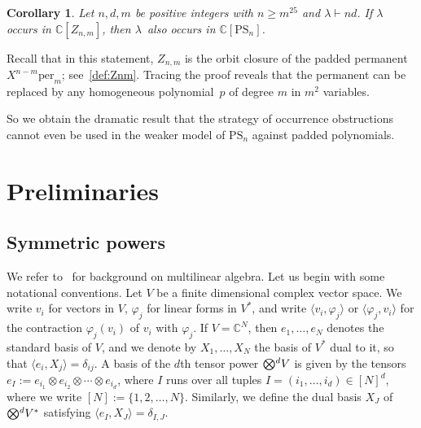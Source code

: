 \documentclass[11pt]{amsart}
\def\C{\mathbb{C}}
\def\per{\mathrm{per}}
\def\la{\lambda}
\newcommand{\tensor}{\smash{\textstyle\bigotimes}}
\newcommand{\PS}{\mathrm{PS}}
\numberwithin{equation}{section}
\newtheorem{corollary}[theorem]{Corollary}
\begin{document}
\begin{corollary}\label{cor:main-PS}
Let $n,d,m$ be positive integers with 
$n \ge m^{25}$ and $\la\vdash nd$. If $\la$ occurs in 
$\C[Z_{n,m}]$, then $\la$~also occurs in $\C[\PS_n]$. 
\end{corollary}

Recall that in this statement, $Z_{n,m}$ is the orbit closure of the padded permanent 
$X^{n-m} \per_m$; see~\eqref{def:Znm}. 
Tracing the proof reveals that the permanent can be replaced by 
any homogeneous polynomial~$p$ of degree $m$ in $m^2$ variables. 

So we obtain the dramatic result that the strategy of occurrence obstructions 
cannot even be used in the weaker model of $\PS_n$ against padded polynomials.


\section{Preliminaries} 
\label{sec:prelim}

\subsection{Symmetric powers}\label{sec:ML} %

We refer to~\cite{northcott:84} for background on multilinear algebra. 
Let us begin with some notational conventions. 
Let $V$ be a finite dimensional complex vector space. 
We write $v_i$ for vectors in $V$, $\varphi_j$ for linear 
forms in $V^*$, and write $\langle v_i, \varphi_j \rangle$ 
or $\langle \varphi_j ,v_i \rangle$ for the contraction $\varphi_j(v_i)$ 
of $v_i$ with $\varphi_j$. 
If $V=\C^N$, then $e_1,\ldots,e_N$ denotes the standard basis of $V$, 
and we denote by $X_1,\ldots,X_N$ the basis of $V^*$ dual to it, so that 
$\langle e_i, X_j\rangle =\delta_{ij}$. 
A basis of the $d$th tensor power $\tensor^d V$ is given by the tensors 
$e_I := e_{i_1} \otimes e_{i_2} \otimes \cdots \otimes e_{i_{d}}$, 
where $I$ runs over all tuples  
$I=(i_1,\ldots,i_d) \in [N]^d$, 
where we write $[N]:=\{1,2,\ldots,N\}$. 
Similarly, we define the dual basis $X_J$ of $\tensor^d V^*$ satisfying 
$\langle e_I, X_J \rangle = \delta_{I,J}$. 
\end{document}
